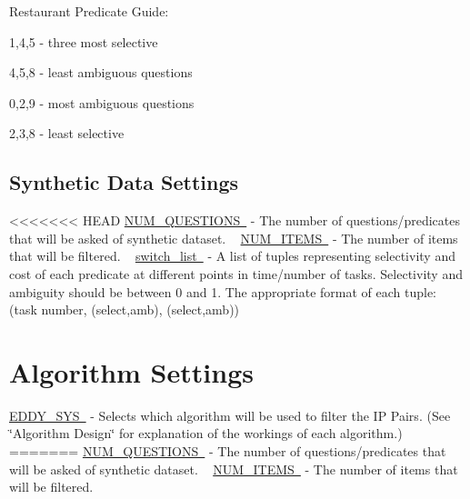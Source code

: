 Restaurant Predicate Guide\+:
\begin{DoxyItemize}
\item 1,4,5 -\/ three most selective
\item 4,5,8 -\/ least ambiguous questions
\item 0,2,9 -\/ most ambiguous questions
\item 2,3,8 -\/ least selective ~\newline
 
\end{DoxyItemize}\hypertarget{toggles_syndata}{}\subsection{Synthetic Data Settings}\label{toggles_syndata}
<<<<<<< HEAD
\mbox{\hyperlink{namespacedynamicfilterapp_1_1toggles_a6e9b8f89b507e81efe828c45c51e3906}{N\+U\+M\+\_\+\+Q\+U\+E\+S\+T\+I\+O\+NS }} -\/ The number of questions/predicates that will be asked of synthetic dataset. ~\newline
 \mbox{\hyperlink{namespacedynamicfilterapp_1_1toggles_a0948720f253a5f2fc7689b2968c8b619}{N\+U\+M\+\_\+\+I\+T\+E\+MS }} -\/ The number of items that will be filtered. ~\newline
 \mbox{\hyperlink{namespacedynamicfilterapp_1_1toggles_abbafede9e00a5523a3cfea9fc4ff4764}{switch\+\_\+list }} -\/ A list of tuples representing selectivity and cost of each predicate at different points in time/number of tasks. Selectivity and ambiguity should be between 0 and 1. The appropriate format of each tuple\+: (task number, (select,amb), (select,amb)) ~\newline
 \hypertarget{toggles_alg}{}\section{Algorithm Settings}\label{toggles_alg}
\mbox{\hyperlink{namespacedynamicfilterapp_1_1toggles_a549d2c90f3f5922ad1442df2113fca1b}{E\+D\+D\+Y\+\_\+\+S\+YS }} -\/ Selects which algorithm will be used to filter the IP Pairs. (See \char`\"{}\+Algorithm Design\char`\"{} for explanation of the workings of each algorithm.) ~\newline
=======
\mbox{\hyperlink{}{N\+U\+M\+\_\+\+Q\+U\+E\+S\+T\+I\+O\+NS }} -\/ The number of questions/predicates that will be asked of synthetic dataset. ~\newline
 \mbox{\hyperlink{}{N\+U\+M\+\_\+\+I\+T\+E\+MS }} -\/ The number of items that will be filtered. ~\newline
